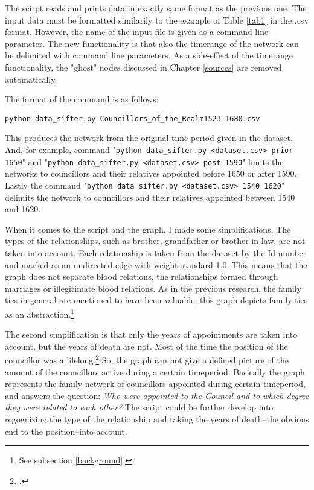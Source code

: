 The scirpt reads and prints data in exactly same format as the previous one. The input data must be formatted similarily to the example of Table \ref{tab1} in the .csv format. However, the name of the input file is given as a command line parameter. The new functionality is that also the timerange of the network can be delimited with command line parameters. As a side-effect of the timerange functionality, the "ghost" nodes discussed in Chapter \ref{sources} are removed automatically.

The format of the command is as follows: 
\begin{verbatim}
python data_sifter.py Councillors_of_the_Realm1523-1680.csv
\end{verbatim}

This produces the network from the original time period given in the dataset. And, for example, command "\texttt{python data\_sifter.py <dataset.csv> prior 1650}" and "\texttt{python data\_sifter.py <dataset.csv> post 1590}" limits the networks to councillors and their relatives appointed before 1650 or after 1590. Lastly the command "\texttt{python data\_sifter.py <dataset.csv> 1540 1620}" delimits the network to councillors and their relatives appointed between 1540 and 1620.

When it comes to the script and the graph, I made some simplifications. The types of the relationships, such as brother, grandfather or brother-in-law, are not taken into account. Each relationship is taken from the dataset by the Id number and marked as an undirected edge with weight standard 1.0. This means that the graph does not separate blood relations, the relationships formed through marriages or illegitimate blood relations. As in the previous research, the family ties in general are mentioned to have been valuable, this graph depicts family ties as an abstraction.\footnote{See subsection \ref{background}.} 

The second simplification is that only the years of appointments are taken into account, but the years of death are not. Most of the time the position of the councillor was a lifelong.\footcite[TODO]{HakanenAKoskinen2017} So, the graph can not give a defined picture of the amount of the councillors active during a certain timeperiod. Basically the graph represents the family network of councillors appointed during certain timeperiod, and answers the question: \textit{Who were appointed to the Council and to which degree they were related to each other?} The script could be further develop into regognizing the type of the relationship and taking the years of death–the obvious end to the position–into account.


